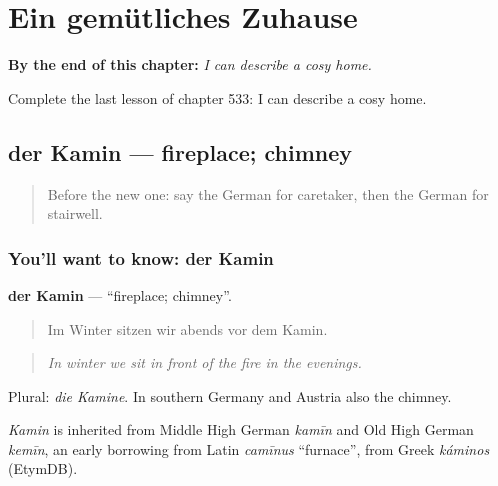 
\chapter{Ein gemütliches Zuhause}
\label{ch:ge-ein-gemutliches-zuhause}

\begin{chapteropening}
\textbf{By the end of this chapter:} \emph{I can describe a cosy home.}

Complete the last lesson of chapter 533: I can describe a cosy home.
\end{chapteropening}

\section[der Kamin]{der Kamin — fireplace; chimney}

\label{lesson:GE-C533-kamin}



\begin{quote}
Before the new one: say the German for caretaker, then the German for stairwell.
\end{quote}

\subsection*{You'll want to know: der Kamin}
\textbf{der Kamin} — \textquotedblleft{}fireplace; chimney\textquotedblright{}.

\begin{quote}
Im Winter sitzen wir abends vor dem Kamin.
\end{quote}

\begin{quote}
\emph{In winter we sit in front of the fire in the evenings.}
\end{quote}

Plural: \emph{die Kamine}. In southern Germany and Austria also the chimney.

\begin{cousinweb}
\emph{Kamin} is inherited from Middle High German \emph{kamīn} and Old High German \emph{kemīn}, an early borrowing from Latin \emph{camīnus} \textquotedblleft{}furnace\textquotedblright{}, from Greek \emph{káminos} (EtymDB).
\end{cousinweb}

